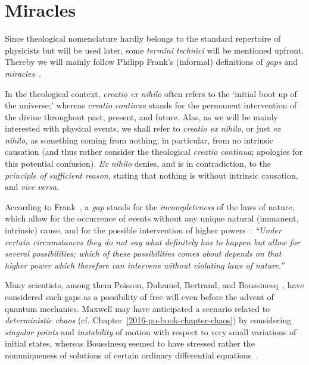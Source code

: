 %
%
%

\chapter{Miracles}
\label{2016-pu-book-chapter-miracle} %


Since theological nomenclature hardly belongs to the standard repertoire of physicists but will be used later,
some {\it termini technici} will be mentioned upfront.
Thereby we will mainly follow Philipp Frank's (informal) definitions of {\em gaps} and {\em miracles}~\cite{frank,franke}.

In the theological context,  {\it creatio ex nihilo} often refers to the `initial boot up of the universe;'
whereas {\it creatio continua} stands for the permanent intervention of the divine throughout past, present, and future.
Alas, as we will be mainly interested with physical events, we shall refer to
{\it creatio ex nihilo}, or just {\it ex nihilo,} as something coming from nothing; in particular, from no intrinsic~\cite{svozil-94} causation
(and thus rather consider the theological {\it creatio continua}; apologies for this potential confusion).
{\it Ex nihilo} denies, and is in contradiction, to the {\em principle of sufficient reason}, stating that nothing is without intrinsic causation, and {\it vice versa}.

According to Frank~\cite[Sect.~II,~12]{frank,franke}, a {\em gap} stands for the {\em incompleteness} of the laws of nature,
which allow for the occurrence of events without any unique natural (immanent, intrinsic) cause, and for the possible intervention of higher powers~\cite[Sect.~II,~9]{frank,franke}: {\em ``Under
certain circumstances they do not say what definitely has to happen
but allow for several possibilities; which of these possibilities comes
about depends on that higher power which therefore can intervene
without violating laws of nature.''}

Many scientists, among them Poisson, Duhamel, Bertrand,   and Boussinesq~\cite{Deakin1988,vanStrien2014},
have considered such gaps as a possibility of free will
even before the advent of quantum mechanics.
Maxwell may have anticipated a scenario related to
{\em deterministic chaos}
 (cf. Chapter~\ref{2016-pu-book-chapter-chaos})
by considering
{\em singular points}
and {\em instability}
 of motion with respect to very small variations of initial states,
whereas Boussinesq seemed to have stressed rather the nonuniqueness of solutions of certain ordinary differential equations~\cite{Lotka-24,Deakin1988,vanStrien2014}.

